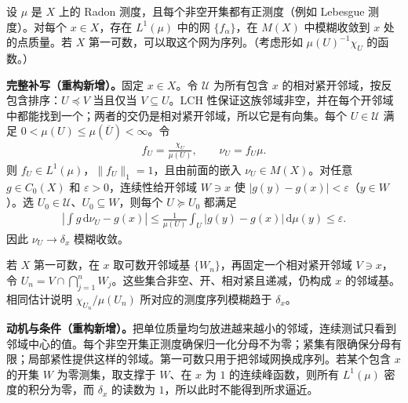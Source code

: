 \documentclass[../../main.tex]{subfiles}
\begin{document}
\begin{exercise}\label{exercise:ch07-density-point-mass}
设 $\mu$ 是 $X$ 上的 Radon 测度，且每个非空开集都有正测度（例如 Lebesgue 测度）。对每个 $x\in X$，存在 $L^1(\mu)$ 中的网 $\{f_\alpha\}$，在 $M(X)$ 中模糊收敛到 $x$ 处的点质量。若 $X$ 第一可数，可以取这个网为序列。（考虑形如 $\mu(U)^{-1}\chi_U$ 的函数。）
\end{exercise}
\begin{solution}
\textbf{完整补写（重构新增）。}固定 $x\in X$。令 $\mathcal U$ 为所有包含 $x$ 的相对紧开邻域，按反包含排序：$U\preceq V$ 当且仅当 $V\subseteq U$。LCH 性保证这族邻域非空，并在每个开邻域中都能找到一个；两者的交仍是相对紧开邻域，所以它是有向集。每个 $U\in\mathcal U$ 满足 $0<\mu(U)\leqslant\mu(\overline U)<\infty$。令
\begin{align*}
f_U=\frac{\chi_U}{\mu(U)},\qquad\nu_U=f_U\mu.
\end{align*}
则 $f_U\in L^1(\mu)$，$\|f_U\|_1=1$，且由前面的嵌入 $\nu_U\in M(X)$。对任意 $g\in C_0(X)$ 和 $\varepsilon>0$，连续性给开邻域 $W\ni x$ 使 $|g(y)-g(x)|<\varepsilon$（$y\in W$）。选 $U_0\in\mathcal U$、$U_0\subseteq W$，则每个 $U\succeq U_0$ 都满足
\begin{align*}
\left|\int g\,\mathrm d\nu_U-g(x)\right|
\leqslant\frac1{\mu(U)}\int_U|g(y)-g(x)|\,\mathrm d\mu(y)
\leqslant\varepsilon.
\end{align*}
因此 $\nu_U\to\delta_x$ 模糊收敛。

若 $X$ 第一可数，在 $x$ 取可数开邻域基 $\{W_n\}$，再固定一个相对紧开邻域 $V\ni x$，令 $U_n=V\cap\bigcap_{j=1}^nW_j$。这些集合非空、开、相对紧且递减，仍构成 $x$ 的邻域基。相同估计说明 $\chi_{U_n}/\mu(U_n)$ 所对应的测度序列模糊趋于 $\delta_x$。
\end{solution}
\begin{remark}
\textbf{动机与条件（重构新增）。}把单位质量均匀放进越来越小的邻域，连续测试只看到邻域中心的值。每个非空开集正测度确保归一化分母不为零；紧集有限确保分母有限；局部紧性提供这样的邻域。第一可数只用于把邻域网换成序列。若某个包含 $x$ 的开集 $W$ 为零测集，取支撑于 $W$、在 $x$ 为 $1$ 的连续峰函数，则所有 $L^1(\mu)$ 密度的积分为零，而 $\delta_x$ 的读数为 $1$，所以此时不能得到所求逼近。
\end{remark}
\end{document}
